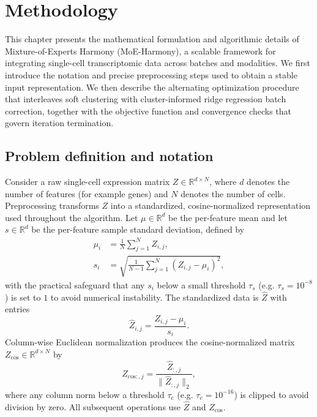 \documentclass{article}
\begin{document}
\section{Methodology}

This chapter presents the mathematical formulation and algorithmic details of Mixture-of-Experts Harmony (MoE-Harmony), a scalable framework for integrating single-cell transcriptomic data across batches and modalities. We first introduce the notation and precise preprocessing steps used to obtain a stable input representation. We then describe the alternating optimization procedure that interleaves soft clustering with cluster-informed ridge regression batch correction, together with the objective function and convergence checks that govern iteration termination.

\subsection{Problem definition and notation}

Consider a raw single-cell expression matrix $Z \in \mathbb{R}^{d \times N}$, where $d$ denotes the number of features (for example genes) and $N$ denotes the number of cells. Preprocessing transforms $Z$ into a standardized, cosine-normalized representation used throughout the algorithm. Let $\mu \in \mathbb{R}^d$ be the per-feature mean and let $s \in \mathbb{R}^d$ be the per-feature sample standard deviation, defined by
\begin{align}
    \mu_i &= \frac{1}{N} \sum_{j=1}^N Z_{i,j}, \\
    s_i &= \sqrt{ \frac{1}{N-1} \sum_{j=1}^N (Z_{i,j} - \mu_i)^2 },
\end{align}
with the practical safeguard that any $s_i$ below a small threshold $\tau_s$ (e.g. $\tau_s = 10^{-8}$) is set to $1$ to avoid numerical instability. The standardized data is $\hat{Z}$ with entries
\begin{equation}
    \hat{Z}_{i,j} = \frac{Z_{i,j} - \mu_i}{s_i}.
\end{equation}
Column-wise Euclidean normalization produces the cosine-normalized matrix $Z_{\mathrm{cos}} \in \mathbb{R}^{d \times N}$ by
\begin{equation}
    Z_{\mathrm{cos}:,j} = \frac{\hat{Z}_{:,j}}{\|\hat{Z}_{:,j}\|_2},
\end{equation}
where any column norm below a threshold $\tau_c$ (e.g. $\tau_c = 10^{-16}$) is clipped to avoid division by zero. All subsequent operations use $\hat{Z}$ and $Z_{\mathrm{cos}}$.
\end{document}
